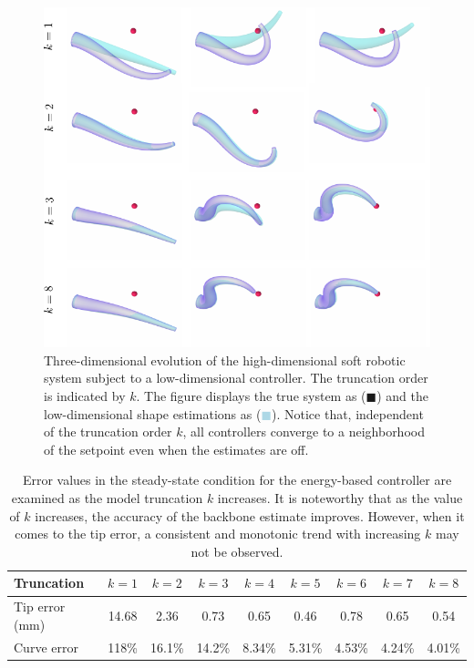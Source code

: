 %
\begin{figure}[!t]
  \centering
  \vspace{-2mm}
  \includegraphics*[width=1.04\textwidth]{./pdf/thesis-figure-5-13.pdf}
  \vspace{-5mm}
  \caption{\small Three-dimensional evolution of the high-dimensional soft robotic system subject to a low-dimensional controller. The truncation order is indicated by $k$. The figure displays the true system as (\textcolor{matinfil!50}{$\blacksquare$}) and the low-dimensional shape estimations as (\textcolor{lightblue}{$\blacksquare$}). Notice that, independent of the truncation order $k$, all controllers converge to a neighborhood of the setpoint even when the estimates are off. }
  \label{fig:C3:softarm_3D_truncation}
  \vspace{-6mm}
\end{figure}

\renewcommand\arraystretch{1.15}
\begin{table}[b]
  \setlength\tabcolsep{0.44em}
  \caption{\small Error values in the steady-state condition for the energy-based controller are examined as the model truncation $k$ increases. It is noteworthy that as the value of $k$ increases, the accuracy of the backbone estimate improves. However, when it comes to the tip error, a consistent and monotonic trend with increasing $k$ may not be observed.}
  \label{tab:C3:EX3:error} \centering
  \begin{tabular}{l||cccccccc}
    \hline
    Truncation & $k=1$ & $k=2$ & $k=3$ & $k=4$ & $k=5$ & $k=6$ & $k=7$ & $k=8$ \\
    \hline 
    \hline
    Tip error (mm) & 14.68 & 2.36 & 0.73 & 0.65 & 0.46 & 0.78 & 0.65 & 0.54\\
    Curve error & 118\% & 16.1\% & 14.2\% & 8.34\% & 5.31\% & 4.53\% & 4.24\% & 4.01\% \\
    \hline
  \end{tabular}
  \end{table}
%

